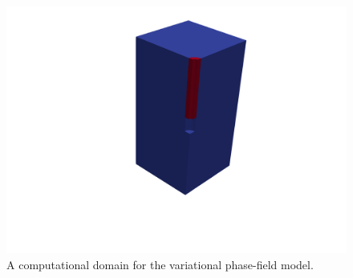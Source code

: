 \begin{figure}[!ht]
\centering
\includegraphics[width=1.0\textwidth]{figures/VPF_init.png}
\caption{A computational domain for the variational phase-field model.}
\label{fig:VPF_init}
\end{figure}

